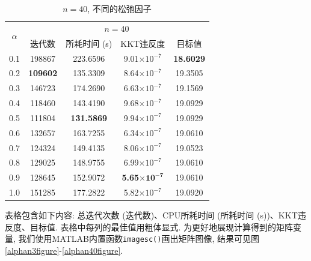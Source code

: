 \documentclass[UTF8,10.5pt,a4paper]{ctexart}
\theoremstyle{definition}
\theoremstyle{definition}
\begin{document}
\begin{table}[htbp]
	\renewcommand{\captionfont}{\small}
    \centering
    \caption{$n=40$, 不同的松弛因子}
    \label{n40alpha}
    \vskip 4mm
    \begin{tabular}{c|c|c|c|c}
        \hline
        \multirow{2}{*}{$\alpha$} & \multicolumn{4}{c}{$n=40$}\\\cline{2-5}
          & 迭代数 & 所耗时间 (s) & KKT违反度 & 目标值\\\hline
        0.1 & 198867 & 223.6596 & 9.01$\times10^{-7}$ & \textbf{18.6029} \\\hline
        0.2 & \textbf{109602} & 135.3309 & 8.64$\times10^{-7}$ & 19.3505 \\\hline
        0.3 & 146723 & 174.2690 & 6.63$\times10^{-7}$ & 19.1569 \\\hline
        0.4 & 118460 & 143.4190 & 9.68$\times10^{-7}$ & 19.0929 \\\hline
        0.5 & 111804 & \textbf{131.5869} & 9.94$\times10^{-7}$ & 19.0929 \\\hline
        0.6 & 132657 & 163.7255 & 6.34$\times10^{-7}$ & 19.0610 \\\hline
        0.7 & 124324 & 149.4135 & 8.06$\times10^{-7}$ & 19.0523 \\\hline
        0.8 & 129025 & 148.9755 & 6.99$\times10^{-7}$ & 19.0610 \\\hline
        0.9 & 128645 & 152.9072 & \textbf{5.65$\mathbf{\times10^{-7}}$} & 19.0610 \\\hline
        1.0 & 151285 & 177.2822 & 5.82$\times10^{-7}$ & 19.0920 \\\hline
    \end{tabular}
\end{table}
表格包含如下内容: 总迭代次数 (迭代数)、CPU所耗时间 (所耗时间 (s))、KKT违反度、目标值. 表格中每列的最佳值用粗体显式. 为更好地展现计算得到的矩阵变量, 我们使用MATLAB内置函数\texttt{imagesc()}画出矩阵图像, 结果可见图\ref{alphan3figure}-\ref{alphan40figure}. 
\end{document}
